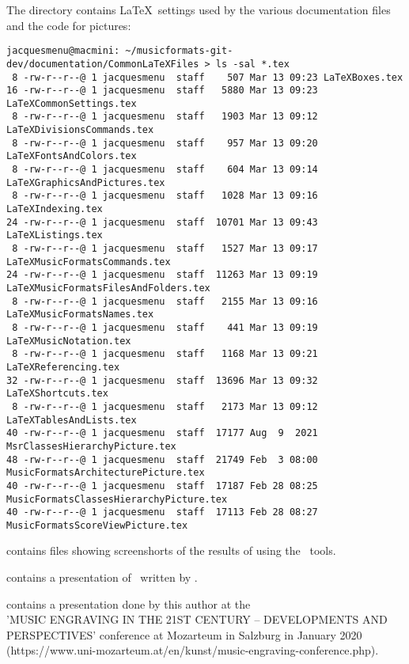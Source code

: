 The  directory contains \LaTeX\ settings used by the various documentation files and the code for pictures:
\begin{lstlisting}[language=Terminal]
jacquesmenu@macmini: ~/musicformats-git-dev/documentation/CommonLaTeXFiles > ls -sal *.tex
 8 -rw-r--r--@ 1 jacquesmenu  staff    507 Mar 13 09:23 LaTeXBoxes.tex
16 -rw-r--r--@ 1 jacquesmenu  staff   5880 Mar 13 09:23 LaTeXCommonSettings.tex
 8 -rw-r--r--@ 1 jacquesmenu  staff   1903 Mar 13 09:12 LaTeXDivisionsCommands.tex
 8 -rw-r--r--@ 1 jacquesmenu  staff    957 Mar 13 09:20 LaTeXFontsAndColors.tex
 8 -rw-r--r--@ 1 jacquesmenu  staff    604 Mar 13 09:14 LaTeXGraphicsAndPictures.tex
 8 -rw-r--r--@ 1 jacquesmenu  staff   1028 Mar 13 09:16 LaTeXIndexing.tex
24 -rw-r--r--@ 1 jacquesmenu  staff  10701 Mar 13 09:43 LaTeXListings.tex
 8 -rw-r--r--@ 1 jacquesmenu  staff   1527 Mar 13 09:17 LaTeXMusicFormatsCommands.tex
24 -rw-r--r--@ 1 jacquesmenu  staff  11263 Mar 13 09:19 LaTeXMusicFormatsFilesAndFolders.tex
 8 -rw-r--r--@ 1 jacquesmenu  staff   2155 Mar 13 09:16 LaTeXMusicFormatsNames.tex
 8 -rw-r--r--@ 1 jacquesmenu  staff    441 Mar 13 09:19 LaTeXMusicNotation.tex
 8 -rw-r--r--@ 1 jacquesmenu  staff   1168 Mar 13 09:21 LaTeXReferencing.tex
32 -rw-r--r--@ 1 jacquesmenu  staff  13696 Mar 13 09:32 LaTeXShortcuts.tex
 8 -rw-r--r--@ 1 jacquesmenu  staff   2173 Mar 13 09:12 LaTeXTablesAndLists.tex
40 -rw-r--r--@ 1 jacquesmenu  staff  17177 Aug  9  2021 MsrClassesHierarchyPicture.tex
48 -rw-r--r--@ 1 jacquesmenu  staff  21749 Feb  3 08:00 MusicFormatsArchitecturePicture.tex
40 -rw-r--r--@ 1 jacquesmenu  staff  17187 Feb 28 08:25 MusicFormatsClassesHierarchyPicture.tex
40 -rw-r--r--@ 1 jacquesmenu  staff  17113 Feb 28 08:27 MusicFormatsScoreViewPicture.tex
\end{lstlisting}

 contains  files showing screenshorts of the results of using the \mf\ tools.

 contains a presentation of \libmusicxml\ written by \fober.

 contains a presentation done by this author at the \\
'MUSIC ENGRAVING IN THE 21ST CENTURY -- DEVELOPMENTS AND PERSPECTIVES' conference at Mozarteum in Salzburg in January 2020 (https://www.uni-mozarteum.at/en/kunst/music-engraving-conference.php).


